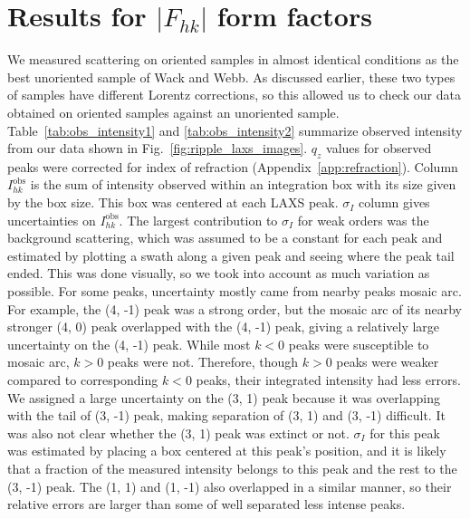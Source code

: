 \section{Results for $|F_{hk}|$ form factors}\label{sec:LAXS_form_factors}
We measured scattering on oriented samples in almost identical conditions as the
best unoriented sample of Wack and Webb. As discussed earlier,
these two types of samples have different Lorentz corrections, so 
this allowed us to check our data obtained on 
oriented samples against an unoriented sample.
Table~\ref{tab:obs_intensity1} and \ref{tab:obs_intensity2} summarize observed 
intensity from our data shown in Fig.~\ref{fig:ripple_laxs_images}. $q_z$ values 
for observed peaks were corrected for index of refraction (Appendix~\ref{app:refraction}).
Column $I^\text{obs}_{hk}$ is the sum of intensity observed within an
integration box with its size given by the box size. This box was centered
at each LAXS peak. $\sigma_I$ column gives uncertainties on $I^\text{obs}_{hk}$.
The largest contribution to $\sigma_I$ for weak orders 
was the background scattering, which
was assumed to be a constant for each peak and 
estimated by plotting a swath along a given peak and seeing where 
the peak tail ended. This was done visually, so we took into account
as much variation as possible. For some peaks, uncertainty mostly came 
from nearby peaks mosaic arc. For example, the (4, -1) peak was a
strong order, but the mosaic arc of its nearby stronger (4, 0) peak  
overlapped with the (4, -1) peak, giving a relatively large uncertainty
on the (4, -1) peak. While most $k<0$ peaks were susceptible to
mosaic arc, $k > 0$ peaks were not. Therefore, though $k> 0$ peaks were weaker
compared to corresponding $k < 0$ peaks, their integrated intensity
had less errors. We assigned a large uncertainty on the (3, 1) peak because
it was overlapping with the tail of (3, -1) peak, making separation of 
(3, 1) and (3, -1) difficult. It was also not clear whether the (3, 1) peak
was extinct or not. $\sigma_I$ for this peak was estimated by placing a
box centered at this peak's position, and it is likely that a fraction
of the measured intensity belongs to this peak and the rest to the (3, -1) peak.
The (1, 1) and (1, -1) also overlapped in a similar manner, so their
relative errors are larger than some of well separated less intense peaks.

